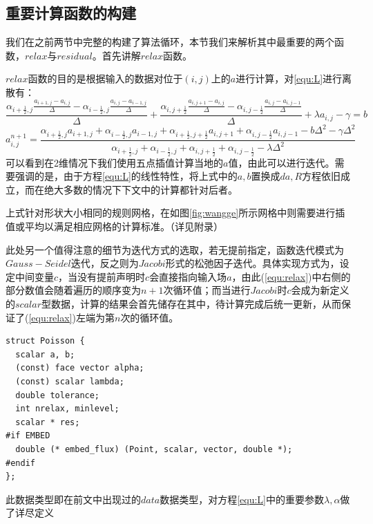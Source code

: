 \documentclass[lang=cn,11pt,a4paper]{elegantpaper}
\begin{document}
\subsection{重要计算函数的构建}\label{sec:relaxres}
我们在之前两节中完整的构建了算法循环，本节我们来解析其中最重要的两个函数，$relax$与$residual$。首先讲解$relax$函数。\par
$relax$函数的目的是根据输入的数据对位于$(i,j)$上的$a$进行计算，对\ref{equ:L}进行离散有：
\begin{equation}
    \frac{\alpha_{i+\frac{1}{2},j}\frac{a_{i+1,j}-a_{i,j}}{\Delta}-\alpha_{i-\frac{1}{2},j}\frac{a_{i,j}-a_{i-1,j}}{\Delta}}{\Delta}+\frac{\alpha_{i,j+\frac{1}{2}}\frac{a_{i,j+1}-a_{i,j}}{\Delta}-\alpha_{i,j-\frac{1}{2}}\frac{a_{i,j}-a_{i,j-1}}{\Delta}}{\Delta}+\lambda a_{i,j}-\gamma=b
\end{equation}
\begin{equation}\label{equ:relax}
    a_{i,j}^{n+1}=\frac{\alpha_{i+\frac{1}{2},j}a_{i+1,j}+\alpha_{i-\frac{1}{2},j}a_{i-1,j}+\alpha_{i+\frac{1}{2},j+\frac{1}{2}}a_{i,j+1}+\alpha_{i,j-\frac{1}{2}}a_{i,j-1}-b\Delta^2-\gamma\Delta^2}{\alpha_{i+\frac{1}{2},j}+\alpha_{i-\frac{1}{2},j}+\alpha_{i,j+\frac{1}{2}}+\alpha_{i,j-\frac{1}{2}}-\lambda\Delta^2}
\end{equation}
可以看到在2维情况下我们使用五点插值计算当地的$a$值，由此可以进行迭代。需要强调的是，由于方程\ref{equ:L}的线性特性，将上式中的$a,b$置换成$da,R$方程依旧成立，而在绝大多数的情况下下文中的计算都针对后者。\par
上式针对形状大小相同的规则网格，在如图\ref{fig:wangge}所示网格中则需要进行插值或平均以满足相应网格的计算标准。（详见附录）\par
此处另一个值得注意的细节为迭代方式的选取，若无提前指定，函数迭代模式为$Gauss-Seidel$迭代，反之则为$Jacobi$形式的松弛因子迭代。具体实现方式为，设定中间变量$c$，当没有提前声明时$c$会直接指向输入场$a$，由此(\ref{equ:relax})中右侧的部分数值会随着遍历的顺序变为$n+1$次循环值；而当进行$Jacobi$时$c$会成为新定义的$scalar$型数据，计算的结果会首先储存在其中，待计算完成后统一更新，从而保证了(\ref{equ:relax})左端为第$n$次的循环值。
\begin{verbatim}
struct Poisson {
  scalar a, b;
  (const) face vector alpha;
  (const) scalar lambda;
  double tolerance;
  int nrelax, minlevel;
  scalar * res;
#if EMBED
  double (* embed_flux) (Point, scalar, vector, double *);
#endif
};
\end{verbatim}
此数据类型即在前文中出现过的$data$数据类型，对方程\ref{equ:L}中的重要参数$\lambda,\alpha$做了详尽定义
\end{document}
